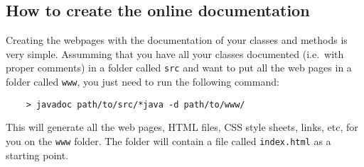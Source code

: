 \subsection{How to create the online documentation}
\label{sec:how-create-online}

Creating the webpages with the documentation of your classes and
methods is very simple. Assumming that you have all your classes
documented (i.e.~with proper comments) in a folder called \verb+src+
and want to put all the web pages in a folder called \verb+www+, you
just need to run the following command: 

\begin{verbatim}
    > javadoc path/to/src/*java -d path/to/www/
\end{verbatim}

This will generate all the web pages, HTML files, CSS style sheets,
links, etc, for you on the \verb+www+ folder. The folder will contain
a file called \verb+index.html+ as a starting point. 

